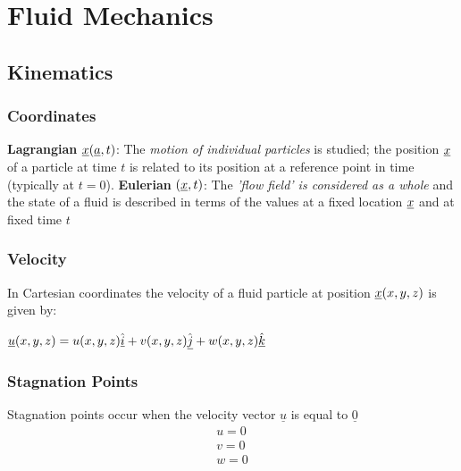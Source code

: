 \section{Fluid Mechanics}
\subsection{Kinematics}
\subsubsection{Coordinates}
\textbf{Lagrangian} $\underline{\boldmath{x}}(\underline{\boldmath{a}},t)$: The \textit{motion of individual particles} is studied; the position $\underline{\boldmath{x}}$ of a particle at time $t$ is related to its position at a reference point in time \underline{} (typically at $t=0$).
\newline
\newline
\textbf{Eulerian} $(\underline{\boldmath{x}},t)$: 
The \textit{'flow field' is considered as a whole} and the state of a fluid is described in terms of the values at a fixed location $\underline{\boldmath{x}}$ and at fixed time $t$
\subsubsection{Velocity}
In Cartesian coordinates the velocity of a fluid particle at position $\underline{\boldmath{x}}(x,y,z)$ is given by:
\begin{center}
	$\underline{\boldmath{u}}(x,y,z) = u(x,y,z)\underline{\hat{i}} + v(x,y,z)\underline{\hat{j}} + w(x,y,z)\underline{\hat{k}}$
\end{center}
\subsubsection{Stagnation Points}
Stagnation points occur when the velocity vector $\underline{u}$ is equal to $\underline{0}$
\begin{align*}
	u = 0
	\\
	v= 0
	\\
	w= 0
\end{align*}
